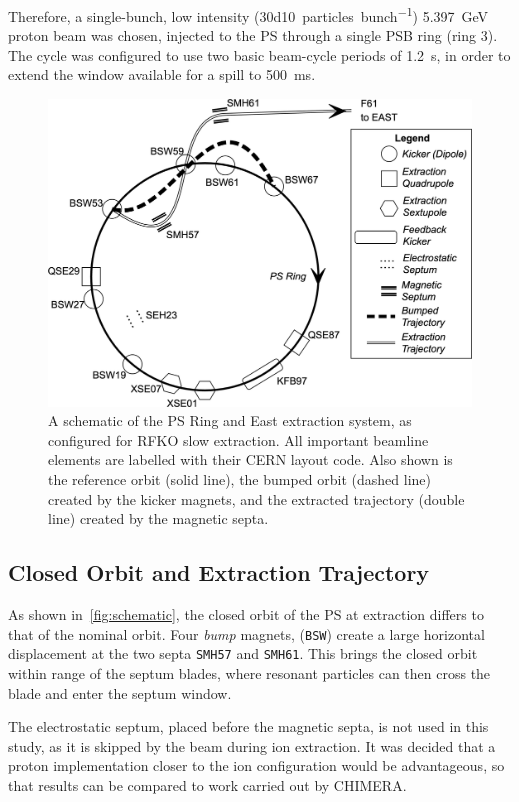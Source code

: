 \documentclass[11pt]{report}
\begin{document}
Therefore, a single-bunch, low intensity (\qty[per-mode=symbol]{30d10}{particles\per bunch}) \qty{5.397}{\giga\electronvolt} proton beam was chosen, injected to the PS through a single PSB ring (ring 3). The cycle was configured to use two basic beam-cycle periods of \qty{1.2}{\second}, in order to extend the window available for a spill to \qty{500}{\milli\second}.

\begin{figure}
  \centering
  \includegraphics*[width=\linewidth]{ps-sx-system.png}
  \caption{A schematic of the PS Ring and East extraction system, as configured for RFKO slow extraction. All important beamline elements are labelled with their CERN layout code. Also shown is the reference orbit (solid line), the bumped orbit (dashed line) created by the kicker magnets, and the extracted trajectory (double line) created by the magnetic septa.}\label{fig:schematic}
\end{figure}

\subsection{Closed Orbit and Extraction Trajectory}

As shown in~\autoref{fig:schematic}, the closed orbit of the PS at extraction differs to that of the nominal orbit. Four \textit{bump} magnets, (\verb|BSW|) create a large horizontal displacement at the two septa \verb|SMH57| and \verb|SMH61|. This brings the closed orbit within range of the septum blades, where resonant particles can then cross the blade and enter the septum window.

The electrostatic septum, placed before the magnetic septa, is not used in this study, as it is skipped by the beam during ion extraction. It was decided that a proton implementation closer to the ion configuration would be advantageous, so that results can be compared to work carried out by CHIMERA.
\end{document}
